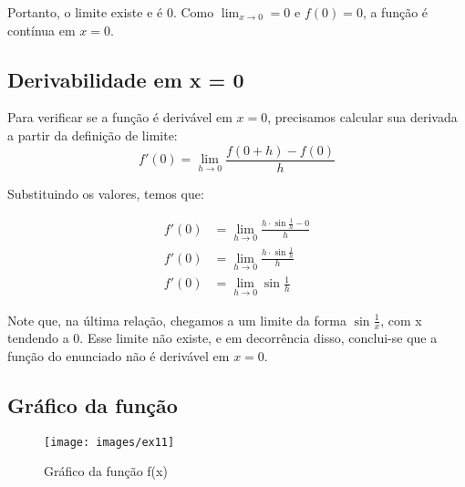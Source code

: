 \documentclass[../resumo.tex]{subfiles}
\begin{document}
	Portanto, o limite existe e é 0. Como $\lim_{x\to0} = 0$ e $f(0) = 0$, a função é contínua em $x = 0$.



	\subsection{Derivabilidade em x = 0}

	Para verificar se a função é derivável em $x = 0$, precisamos calcular sua derivada a partir da definição
	de limite:
	\[f'(0) = \lim_{h\to0} \frac{f(0 + h) - f(0)}{h}\]

	Substituindo os valores, temos que:

	\begin{align*}
			f'(0) &= \lim_{h\to0} \frac{h\cdot\sin{\frac{1}{h}} - 0}{h} \\
			f'(0) &= \lim_{h\to0} \frac{h\cdot\sin{\frac{1}{h}}}{h} \\
			f'(0) &= \lim_{h\to0} \sin{\frac{1}{h}}
	\end{align*}

	Note que, na última relação, chegamos a um limite da forma $\sin{\frac{1}{x}}$, com x tendendo a 0.
	Esse limite não existe, e em decorrência disso, conclui-se que a função do enunciado não é derivável em
	 $x = 0$.


 \subsection{Gráfico da função}

 \begin{figure}[H]
    \centering
    \texttt{[image: images/ex11]}
    \caption{Gráfico da função f(x)}
 \end{figure}
\end{document}
